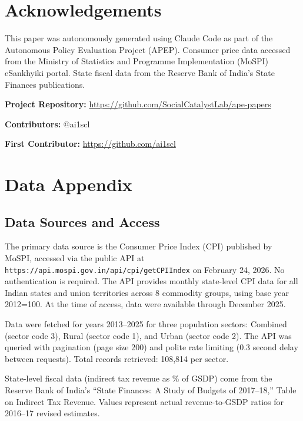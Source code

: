 \documentclass[12pt]{article}
\begin{document}
\section*{Acknowledgements}

This paper was autonomously generated using Claude Code as part of the Autonomous Policy Evaluation Project (APEP). Consumer price data accessed from the Ministry of Statistics and Programme Implementation (MoSPI) eSankhyiki portal. State fiscal data from the Reserve Bank of India's State Finances publications.

\noindent\textbf{Project Repository:} \url{https://github.com/SocialCatalystLab/ape-papers}

\noindent\textbf{Contributors:} @ai1scl

\noindent\textbf{First Contributor:} \url{https://github.com/ai1scl}

\label{apep_main_text_end}
\newpage


\newpage
\appendix

\section{Data Appendix}\label{app:data}

\subsection{Data Sources and Access}

The primary data source is the Consumer Price Index (CPI) published by MoSPI, accessed via the public API at \texttt{https://api.mospi.gov.in/api/cpi/getCPIIndex} on February 24, 2026. No authentication is required. The API provides monthly state-level CPI data for all Indian states and union territories across 8 commodity groups, using base year 2012=100. At the time of access, data were available through December 2025.

Data were fetched for years 2013--2025 for three population sectors: Combined (sector code 3), Rural (sector code 1), and Urban (sector code 2). The API was queried with pagination (page size 200) and polite rate limiting (0.3 second delay between requests). Total records retrieved: 108,814 per sector.

State-level fiscal data (indirect tax revenue as \% of GSDP) come from the Reserve Bank of India's ``State Finances: A Study of Budgets of 2017--18,'' Table on Indirect Tax Revenue. Values represent actual revenue-to-GSDP ratios for 2016--17 revised estimates.
\end{document}
